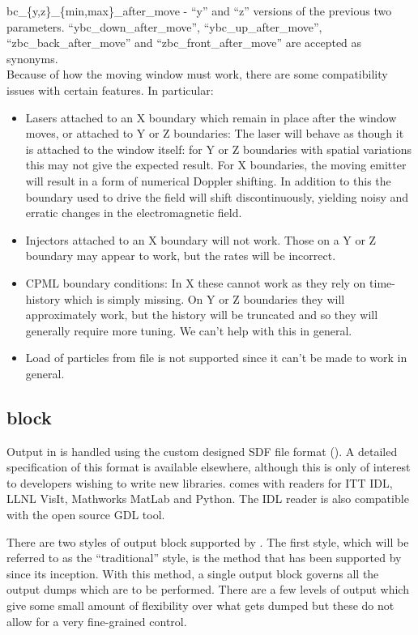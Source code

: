 {\emphtext bc\_\{y,z\}\_\{min,max\}\_after\_move} - ``y'' and ``z'' versions of
  the previous two parameters.
  ``ybc\_down\_after\_move'', ``ybc\_up\_after\_move'',
  ``zbc\_back\_after\_move'' and ``zbc\_front\_after\_move'' are accepted as
  synonyms.\\

Because of how the moving window must work, there are some compatibility issues
with certain features. In particular:
\begin{itemize}
\item Lasers attached to an X boundary which remain in place after the window
moves, or attached to Y or Z boundaries:
\subitem The laser will behave as though it is attached to the window itself:
for Y or Z boundaries with spatial variations this may not give the expected
result.
\subitem For X boundaries, the moving emitter will result in a form of
numerical Doppler shifting. In addition to this the boundary used to drive
the field will shift discontinuously, yielding noisy and erratic changes
in the electromagnetic field.
\item Injectors attached to an X boundary will not work. Those on a Y
or Z boundary may appear to work, but the rates will be incorrect.
\item CPML boundary conditions:
\subitem In X these cannot work as they rely on time-history which is
simply missing.
\subitem On Y or Z boundaries they will approximately work, but the history
will be truncated and so they will generally require more tuning.
We can't help with this in general.
\item Load of particles from file is not supported since it can't be made to
work in general.
\end{itemize}

\subsection{ block}
\label{sec:output_block}
Output in {\EPOCH} is handled using the custom designed SDF file format
(). A detailed specification of this
format is available elsewhere, although this is only of interest to
developers wishing to write new libraries.
{\EPOCH} comes with readers for ITT IDL, LLNL VisIt, Mathworks MatLab and
Python.
The IDL reader is also compatible with the open source GDL tool.

There are two styles of output block supported by {\EPOCH}. The first
style, which will be referred to as the ``traditional'' style, is the
method that has been supported by {\EPOCH} since its inception. With this
method, a single output block governs all the output dumps which are to be
performed. There are a few levels of output which give some small amount of
flexibility over what gets dumped but these do not allow for a very
fine-grained control.

